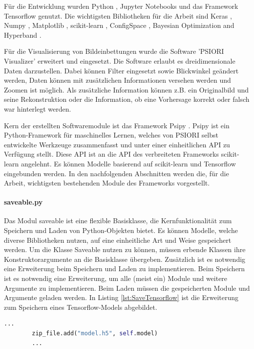 	Für die Entwicklung wurden Python \cite{PythonSoftwareFoundation.2020}, Jupyter Notebooks \cite{ProjectJupyter.} und das Framework Tensorflow \cite{MartinAbadi.2015}  genutzt. Die wichtigsten Bibliotheken für die Arbeit sind Keras \cite{Chollet.2015} , Numpy \cite{Oliphant.2006} , Matplotlib \cite{Hunter.2007} , scikit-learn \cite{Pedregosa.2011} , ConfigSpace \cite{Lindauer.2019} , Bayesian Optimization and Hyperband \cite{StefanFalkner.2018}. 
	
	Für die Visualisierung von Bildeinbettungen wurde die Software 'PSIORI Visualizer' erweitert und eingesetzt. Die Software erlaubt es dreidimensionale Daten darzustellen. Dabei können Filter eingesetzt sowie Blickwinkel geändert werden, Daten können mit zusätzlichen Informationen versehen werden und Zoomen ist möglich. Als zusätzliche Information können z.B. ein Originalbild und seine Rekonstruktion oder die Information, ob eine Vorhersage korrekt oder falsch war hinterlegt werden.
	
	Kern der erstellten Softwaremodule ist das Framework  Psipy \cite{PSIORIGmbH.2019}. Psipy ist ein Python-Framework für maschinelles Lernen, welches von PSIORI selbst entwickelte Werkzeuge zusammenfasst und unter einer einheitlichen API zu Verfügung stellt. Diese API ist an die API des verbreiteten Frameworks scikit-learn angelehnt. Es können Modelle basierend auf scikit-learn  und Tensorflow eingebunden werden. In den nachfolgenden Abschnitten werden die, für die Arbeit, wichtigsten bestehenden Module des Frameworks vorgestellt.
	
	 \paragraph{saveable.py} Das Modul saveable ist eine flexible Basisklasse, die Kernfunktionalität zum Speichern und Laden von Python-Objekten bietet. Es können Modelle, welche diverse Bibliotheken nutzen, auf eine einheitliche Art und Weise gespeichert werden. Um die Klasse Saveable nutzen zu können, müssen erbende Klassen ihre Konstruktorargumente an die Basisklasse übergeben. Zusätzlich ist es notwendig eine Erweiterung beim Speichern und Laden zu implementieren. Beim Speichern ist es notwendig eine Erweiterung, um alle (meist ein) Module und weitere Argumente zu implementieren. Beim Laden müssen die gespeicherten Module und Argumente geladen werden. In Listing \ref{lst:SaveTensorflow} ist die Erweiterung zum Speichern eines Tensorflow-Models abgebildet. 
	\begin{lstlisting}[language=python,caption=Erweiterung zum Speichern eines Tensorflow Models, label=lst:SaveTensorflow]
		...
		zip_file.add("model.h5", self.model)
		...
	\end{lstlisting}

